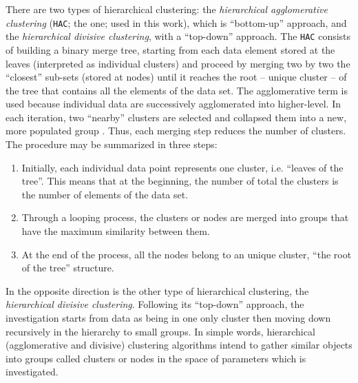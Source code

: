 \documentclass[fleqn,usenatbib]{mnras}
\newcommand{\comment}[1]{\textcolor{red}{#1}}
\begin{document}
There are two types of hierarchical
clustering: 
the \textit{hierarchical agglomerative clustering} (\texttt{HAC}; the one; used in this work), 
which is ``bottom-up'' approach, and the \textit{hierarchical divisive clustering}, 
with a ``top-down'' approach. 
The \texttt{HAC} consists of building a binary merge tree, starting from 
each data element stored at the leaves (interpreted as individual clusters)
and proceed by merging two by two the ``closest'' sub-sets (stored at nodes)
until it reaches the root -- unique cluster -- of the tree that contains all the elements
of the data set. The agglomerative term is used because individual data
 are successively agglomerated into higher-level. In each iteration, two ``nearby'' clusters
are selected 
and collapsed them into a new, more populated group \citep{Mann:2013, Aggarwal:2015}.
 Thus, each merging step reduces the number of clusters. 
The procedure may be summarized in three steps:

\begin{enumerate}
\item Initially, each individual data point represents one cluster, i.e. ``leaves of the tree''. 
This means that at the beginning, the number of total the clusters is the number 
of elements of the data set.
\item Through a looping process, the clusters or nodes are merged into groups that 
have the maximum similarity between them.
\item At the end of the process, all the nodes belong to an unique cluster, ``the root of the tree'' structure.
 \end{enumerate}

In the opposite direction is the other type of hierarchical clustering, the \textit{hierarchical divisive clustering}. 
Following its ``top-down'' approach, the investigation starts from data as being in one only cluster then moving down recursively
in the hierarchy to small groups.
In simple words, hierarchical (agglomerative and divisive) clustering 
algorithms intend to 
gather similar objects into groups called clusters or nodes in the space of parameters which is investigated. 
\end{document}
